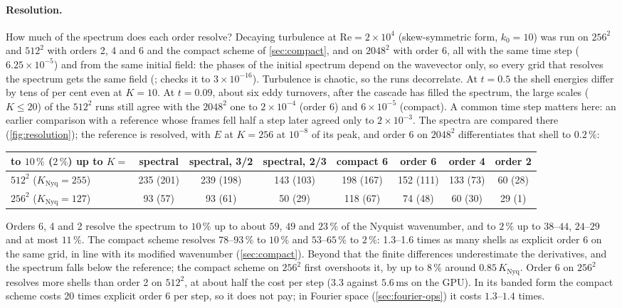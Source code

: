 \documentclass[11pt,a4paper]{article}
\newcommand{\Rey}{\mathrm{Re}}
\newcommand{\code}[1]{\texttt{\detokenize{#1}}}
\begin{document}
\paragraph{Resolution.}  How much of the spectrum does each order resolve?  Decaying turbulence at $\Rey=2\times10^4$ (skew-symmetric form, $k_0=10$) was run on $256^2$ and $512^2$ with orders 2, 4 and 6 and the compact scheme of \cref{sec:compact}, and on $2048^2$ with order 6, all with the same time step ($6.25\times10^{-5}$) and from the same initial field: the phases of the initial spectrum depend on the wavevector only, so every grid that resolves the spectrum gets the same field (\code{random_initial_field()}; \code{make test} checks it to $3\times10^{-16}$).  Turbulence is chaotic, so the runs decorrelate.  At $t=0.5$ the shell energies differ by tens of per cent even at $K=10$.  At $t=0.09$, about six eddy turnovers, after the cascade has filled the spectrum, the large scales ($K\le20$) of the $512^2$ runs still agree with the $2048^2$ one to $2\times10^{-4}$ (order 6) and $6\times10^{-5}$ (compact).  A common time step matters here: an earlier comparison with a reference whose frames fell half a step later agreed only to $2\times10^{-3}$.  The spectra are compared there (\cref{fig:resolution}); the reference is resolved, with $E$ at $K=256$ at $10^{-8}$ of its peak, and order 6 on $2048^2$ differentiates that shell to $0.2\,\%$:
\begin{center}\small
\setlength{\tabcolsep}{4pt}
\begin{tabular}{lccccccc}
\toprule
to $10\,\%$ ($2\,\%$) up to $K=$ & spectral & spectral, 3/2 & spectral, 2/3 & compact 6 & order 6 & order 4 & order 2 \\
\midrule
$512^2$ ($K_{\mathrm{Nyq}}=255$) & 235 (201) & 239 (198) & 143 (103) & 198 (167) & 152 (111) & 133 (73) & 60 (28) \\
$256^2$ ($K_{\mathrm{Nyq}}=127$) & 93 (57) & 93 (61) & 50 (29) & 118 (67) & 74 (48) & 60 (30) & 29 (1) \\
\bottomrule
\end{tabular}
\end{center}
Orders 6, 4 and 2 resolve the spectrum to $10\,\%$ up to about $59$, $49$ and $23\,\%$ of the Nyquist wavenumber, and to $2\,\%$ up to $38$--$44$, $24$--$29$ and at most $11\,\%$.  The compact scheme resolves $78$--$93\,\%$ to $10\,\%$ and $53$--$65\,\%$ to $2\,\%$: 1.3--1.6 times as many shells as explicit order 6 on the same grid, in line with its modified wavenumber (\cref{sec:compact}).  Beyond that the finite differences underestimate the derivatives, and the spectrum falls below the reference; the compact scheme on $256^2$ first overshoots it, by up to $8\,\%$ around $0.85\,K_{\mathrm{Nyq}}$.  Order 6 on $256^2$ resolves more shells than order 2 on $512^2$, at about half the cost per step ($3.3$ against $5.6\,\mathrm{ms}$ on the GPU).  In its banded form the compact scheme costs 20 times explicit order 6 per step, so it does not pay; in Fourier space (\cref{sec:fourier-ops}) it costs $1.3$--$1.4$ times.
\end{document}
